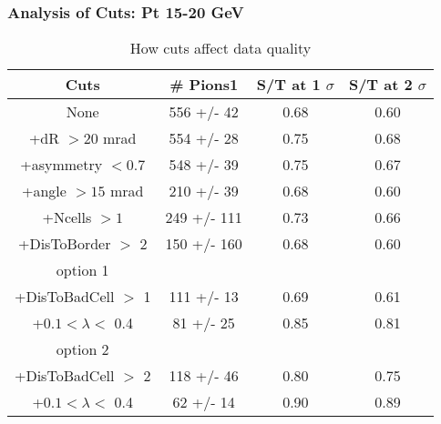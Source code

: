 \frame
{
\frametitle{Analysis of Cuts: Pt 15-20 GeV}
\begin{table}
\caption{How cuts affect data quality}
\centering
\begin{tabular}{c c c c}
\hline\hline
Cuts & \# Pions1 & S/T at 1 $\sigma$ & S/T at 2 $\sigma$ \\ [0.5ex]
\hline
None &  556 +/-   42 & 0.68 & 0.60 \\ %
+dR $> 20$ mrad &  554 +/-   28 & 0.75 & 0.68 \\ %
+asymmetry $< 0.7$ &  548 +/-   39 & 0.75 & 0.67 \\ %
+angle $> 15$ mrad &  210 +/-   39 & 0.68 & 0.60 \\ %
+Ncells $> 1$&  249 +/-  111 & 0.73 & 0.66 \\ %
+DisToBorder $>$ 2 &  150 +/-  160 & 0.68 & 0.60 \\ %
option 1\\
+DisToBadCell $>$ 1&  111 +/-   13 & 0.69 & 0.61 \\ %
+$0.1 < \lambda <$ 0.4 &   81 +/-   25 & 0.85 & 0.81 \\ %
option 2\\
+DisToBadCell $>$ 2&  118 +/-   46 & 0.80 & 0.75 \\ %
+$0.1 < \lambda <$ 0.4 &   62 +/-   14 & 0.90 & 0.89 \\ %
[1ex]
\hline
\end{tabular}
\label{table:nonlin}
\end{table}
}
